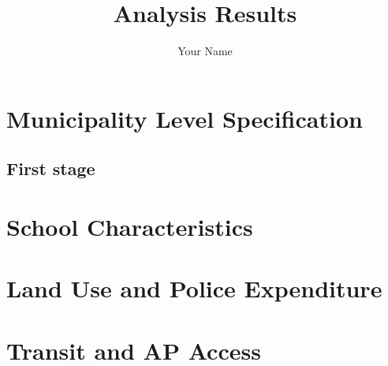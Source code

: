 \documentclass{article}
\begin{document}
\title{Analysis Results}
\author{Your Name}
\date{}

\maketitle

\section{Municipality Level Specification}
\subsection{First stage}







\section{School Characteristics}












\begin{landscape}


\end{landscape}
\section{Land Use and Police Expenditure}




\section{Transit and AP Access}




\end{document}
